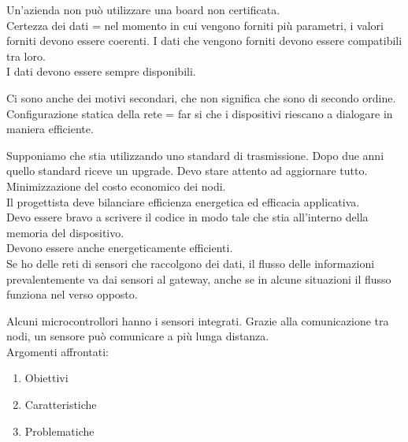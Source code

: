 \documentclass{article}
\begin{document}
    Un'azienda non può utilizzare una board non certificata.\\
    Certezza dei dati = nel momento in cui vengono forniti più parametri, i valori forniti devono essere coerenti. I dati che vengono forniti devono essere compatibili tra loro.\\
    I dati devono essere sempre disponibili.

    Ci sono anche dei motivi secondari, che non significa che sono di secondo ordine.\\
    Configurazione statica della rete = far si che i dispositivi riescano a dialogare in maniera efficiente.
    
    Supponiamo che stia utilizzando uno standard di trasmissione. Dopo due anni quello standard riceve un upgrade. Devo stare attento ad aggiornare tutto.\\
    Minimizzazione del costo economico dei nodi.\\
    Il progettista deve bilanciare efficienza energetica ed efficacia applicativa.\\
    Devo essere bravo a scrivere il codice in modo tale che stia all'interno della memoria del dispositivo.\\
    Devono essere anche energeticamente efficienti.\\
    Se ho delle reti di sensori che raccolgono dei dati, il flusso delle informazioni prevalentemente va dai sensori al gateway, anche se in alcune situazioni il flusso funziona nel verso opposto.

    Alcuni microcontrollori hanno i sensori integrati.
    Grazie alla comunicazione tra nodi, un sensore può comunicare a più lunga distanza.\\

    Argomenti affrontati:
    \begin{enumerate}
        \item Obiettivi
        \item Caratteristiche
        \item Problematiche
    \end{enumerate}
\end{document}
